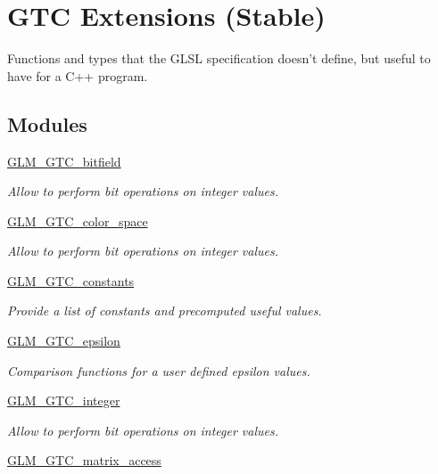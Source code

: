 \hypertarget{group__gtc}{\section{G\-T\-C Extensions (Stable)}
\label{group__gtc}
}


Functions and types that the G\-L\-S\-L specification doesn't define, but useful to have for a C++ program.  


\subsection*{Modules}
\begin{DoxyCompactItemize}
\item 
\hyperlink{group__gtc__bitfield}{G\-L\-M\-\_\-\-G\-T\-C\-\_\-bitfield}
\begin{DoxyCompactList}\small\item\em Allow to perform bit operations on integer values. \end{DoxyCompactList}\item 
\hyperlink{group__gtc__color__space}{G\-L\-M\-\_\-\-G\-T\-C\-\_\-color\-\_\-space}
\begin{DoxyCompactList}\small\item\em Allow to perform bit operations on integer values. \end{DoxyCompactList}\item 
\hyperlink{group__gtc__constants}{G\-L\-M\-\_\-\-G\-T\-C\-\_\-constants}
\begin{DoxyCompactList}\small\item\em Provide a list of constants and precomputed useful values. \end{DoxyCompactList}\item 
\hyperlink{group__gtc__epsilon}{G\-L\-M\-\_\-\-G\-T\-C\-\_\-epsilon}
\begin{DoxyCompactList}\small\item\em Comparison functions for a user defined epsilon values. \end{DoxyCompactList}\item 
\hyperlink{group__gtc__integer}{G\-L\-M\-\_\-\-G\-T\-C\-\_\-integer}
\begin{DoxyCompactList}\small\item\em Allow to perform bit operations on integer values. \end{DoxyCompactList}\item 
\hyperlink{group__gtc__matrix__access}{G\-L\-M\-\_\-\-G\-T\-C\-\_\-matrix\-\_\-access}

\end{DoxyCompactItemize}
